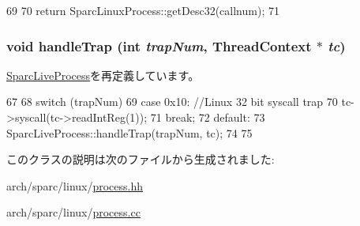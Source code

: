 \begin{DoxyCode}
69     {
70         return SparcLinuxProcess::getDesc32(callnum);
71     }
\end{DoxyCode}
\hypertarget{classSparcISA_1_1Sparc32LinuxProcess_a7737d67ba76be0bd3beb0bd0dc93333a}{
\subsubsection[{handleTrap}]{\setlength{\rightskip}{0pt plus 5cm}void handleTrap (int {\em trapNum}, \/  {\bf ThreadContext} $\ast$ {\em tc})}}
\label{classSparcISA_1_1Sparc32LinuxProcess_a7737d67ba76be0bd3beb0bd0dc93333a}


\hyperlink{classSparcLiveProcess_a7737d67ba76be0bd3beb0bd0dc93333a}{SparcLiveProcess}を再定義しています。


\begin{DoxyCode}
67 {
68     switch (trapNum) {
69       case 0x10: //Linux 32 bit syscall trap
70         tc->syscall(tc->readIntReg(1));
71         break;
72       default:
73         SparcLiveProcess::handleTrap(trapNum, tc);
74     }
75 }
\end{DoxyCode}


このクラスの説明は次のファイルから生成されました:\begin{DoxyCompactItemize}
\item 
arch/sparc/linux/\hyperlink{arch_2sparc_2linux_2process_8hh}{process.hh}\item 
arch/sparc/linux/\hyperlink{arch_2sparc_2linux_2process_8cc}{process.cc}\end{DoxyCompactItemize}
